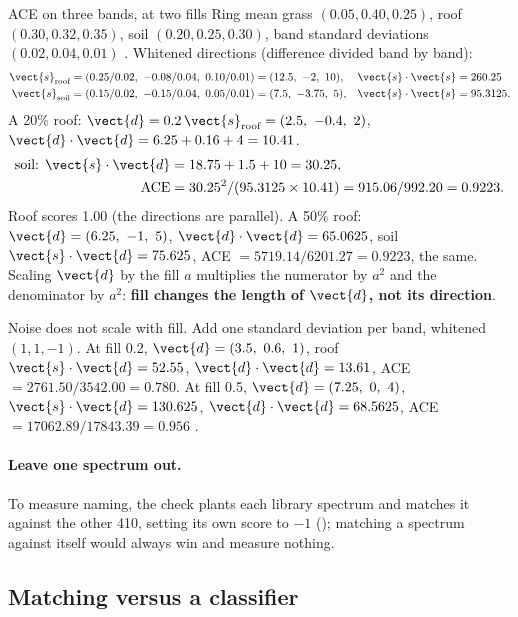 \begin{worked}[label={we:material:ace}]{ACE on three bands, at two fills}
Ring mean grass $(0.05,0.40,0.25)$, roof $(0.30,0.32,0.35)$, soil $(0.20,0.25,0.30)$, band standard deviations
$(0.02,0.04,0.01)$ \tagA. Whitened directions (difference divided band by band):
\begin{align*}
\vect{s}_{\text{roof}} &= (0.25/0.02,\ -0.08/0.04,\ 0.10/0.01)=(12.5,\ -2,\ 10), & \vect{s}\cdot\vect{s}&=260.25\\
\vect{s}_{\text{soil}} &= (0.15/0.02,\ -0.15/0.04,\ 0.05/0.01)=(7.5,\ -3.75,\ 5), & \vect{s}\cdot\vect{s}&=95.3125 .
\end{align*}
A 20\% roof: $\vect{d}=0.2\,\vect{s}_{\text{roof}}=(2.5,\ -0.4,\ 2)$, $\vect{d}\cdot\vect{d}=6.25+0.16+4=10.41$.
\begin{align*}
\text{soil: } \vect{s}\cdot\vect{d} &= 18.75+1.5+10=30.25,\\
\text{ACE} &= 30.25^2/(95.3125\times10.41)=915.06/992.20=0.9223 .
\end{align*}
Roof scores 1.00 (the directions are parallel). A 50\% roof: $\vect{d}=(6.25,\ -1,\ 5)$, $\vect{d}\cdot\vect{d}=65.0625$,
soil $\vect{s}\cdot\vect{d}=75.625$, ACE $=5719.14/6201.27=0.9223$, the same. Scaling $\vect{d}$ by the fill $a$
multiplies the numerator by $a^2$ and the denominator by $a^2$: \textbf{fill changes the length of $\vect{d}$, not its
direction}.

Noise does not scale with fill. Add one standard deviation per band, whitened $(1,1,-1)$. At fill 0.2,
$\vect{d}=(3.5,\ 0.6,\ 1)$, roof $\vect{s}\cdot\vect{d}=52.55$, $\vect{d}\cdot\vect{d}=13.61$, ACE $=2761.50/3542.00=0.780$.
At fill 0.5, $\vect{d}=(7.25,\ 0,\ 4)$, $\vect{s}\cdot\vect{d}=130.625$, $\vect{d}\cdot\vect{d}=68.5625$, ACE
$=17062.89/17843.39=0.956$ \tagC.
\end{worked}

\paragraph{Leave one spectrum out.} To measure naming, the check plants each library spectrum and matches it against
the other 410, setting its own score to $-1$ (); matching a spectrum against itself would always
win and measure nothing.

\subsection{Matching versus a classifier}

